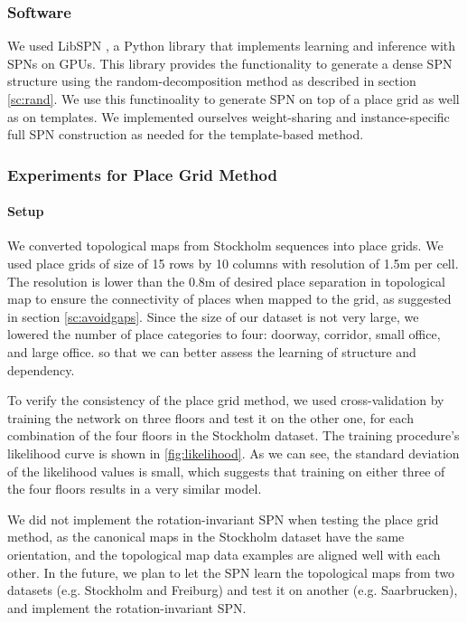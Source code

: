 \documentclass[11pt, titlepage]{article}
\theoremstyle{definition}
\begin{document}
\subsubsection{Software}
We used LibSPN \cite{pronobis2016learning}, a Python library that implements learning and inference with SPNs on GPUs. This library provides the functionality to generate a dense SPN structure using the random-decomposition method as described in section \ref{sc:rand}. We use this functinoality to generate SPN on top of a place grid as well as on templates. We implemented ourselves weight-sharing and instance-specific full SPN construction as needed for the template-based method. 

\subsubsection{Experiments for Place Grid Method}\label{section:exp-grid}

\paragraph{Setup} We converted topological maps from Stockholm sequences into place grids. We used place grids of size of 15 rows by 10 columns with resolution of 1.5m per cell. The resolution is lower than the 0.8m of desired place separation in topological map to ensure the connectivity of places when mapped to the grid, as suggested in section \ref{sc:avoidgaps}. Since the size of our dataset is not very large, we lowered the number of place categories to four: doorway, corridor, small office, and large office. so that we can better assess the learning of structure and dependency.


To verify the consistency of the place grid method,  we used cross-validation by training the network on three floors and test it on the other one, for each combination of the four floors in the Stockholm dataset. The training procedure's likelihood curve is shown in \ref{fig:likelihood}. As we can see, the standard deviation of the likelihood values is small, which suggests that training on either three of the four floors results in a very similar model.

We did not implement the rotation-invariant SPN when testing the place grid method, as the canonical maps in the Stockholm dataset have the same orientation, and the topological map data examples are aligned well with each other. In the future, we plan to let the SPN learn the topological maps from two datasets (e.g. Stockholm and Freiburg) and test it on another (e.g. Saarbrucken), and implement the rotation-invariant SPN.
\end{document}
